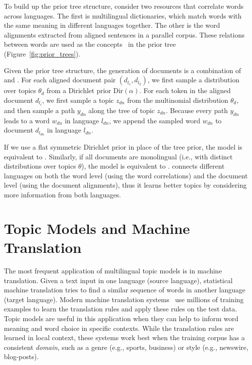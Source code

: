 To build up the prior tree structure, \citet{hu-14} consider two
resources that correlate words across languages. The first is
multilingual dictionaries, which match words with the same meaning in
different languages together. The other is the word alignments
extracted from aligned sentences in a parallel corpus. These relations
between words are used as the concepts~\citep{Bhattacharya-2006} in
the prior tree (Figure~\ref{fig:prior_trees}).

Given the prior tree structure, the generation of documents is a
combination of \tlda{} and \plda{}.  For each aligned document pair
$(d_{l_1}, d_{l_2})$, we first sample a distribution over topics
$\theta_d$ from a Dirichlet prior $\text{Dir}(\alpha)$.  For each
token in the aligned document $d_{l_i}$, we first sample a topic
$z_{dn}$ from the multinomial distribution $\theta_d$, and then sample
a path $y_{dn}$ along the tree of topic $z_{dn}$. Because every path
$y_{dn}$ leads to a word $w_{dn}$ in language $l_{dn}$, we append the
sampled word $w_{dn}$ to document $d_{l_{dn}}$ in language $l_{dn}$.

If we use a flat symmetric Dirichlet prior in place of the tree prior,
the model is equivalent to \plda{}. Similarly, if all documents are monolingual (i.e., with
distinct distributions over topics $\theta$), the model is equivalent to \tlda{}. \ptlda{} connects different languages on both the word
level (using the word correlations) and the document level (using the
document alignments), thus it learns better topics by considering more
information from both languages.



\section{Topic Models and Machine Translation}
\label{sec:tm-mt}

The most frequent application of multilingual topic models is in machine translation.
Given a text input in one language (source language), statistical
machine translation tries to find a similar sequence of words in another
language (target language). Modern machine translation
systems~\citep{koehn-09} use millions of training examples to learn
the translation rules and apply these rules on the test data. 
Topic models are useful in this application when they can help to inform word meaning and word choice in specific contexts.
While the translation rules are learned in local context, these systems work
best when the training corpus has a consistent \emph{domain}, such as a
 genre (e.g., sports, business) or style (e.g.,
newswire, blog-posts). 

